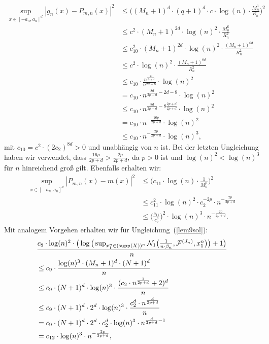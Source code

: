 \begin{equation}
\label{3rdsum}
\begin{split}
\sup_{x \in [-a_n, a_n]^d} |g_n(x) - P_{m,n}(x)|^2 & \leq \bigg((M_n + 1)^d \cdot (q + 1)^d \cdot c \cdot \log(n) \cdot \frac{M_n^3}{R_n}\bigg)^2 \\
& \leq c^2 \cdot (M_n + 1)^{2d} \cdot \log(n)^2 \cdot \frac{M_n^6}{R_n^2} \\
& \leq  c_{10}^2 \cdot (M_n + 1)^{2d} \cdot \log(n)^2 \cdot \frac{(M_n + 1)^{6d}}{R_n^2} \\
& \leq  c^2 \cdot \log(n)^2 \cdot \frac{(M_n + 1)^{8d}}{R_n^2} \\
& \leq c_{10} \cdot \frac{n^{\frac{8d}{2p + d}}}{n^{2d + 8}} \cdot \log(n)^2 \\
& = c_{10} \cdot n^{\frac{8d}{2p + d} - 2d -8} \cdot \log(n)^2 \\
& \leq c_{10} \cdot n^{\frac{8d}{2p + d}  -8\frac{2p + d}{2p + d}} \cdot \log(n)^2 \\
& = c_{10} \cdot n^{-\frac{16p}{2p + d}} \cdot \log(n)^2 \\
& \leq c_{10} \cdot n^{-\frac{2p}{2p + d}} \cdot \log(n)^3,
\end{split}
\end{equation}
mit $c_{10} = c^2 \cdot (2c_2)^{8d} > 0$ und unabhängig von $n$ ist. Bei der letzten Ungleichung haben wir verwendet, dass $\frac{16p}{2p + d} > \frac{2p}{2p + d}$, da $p > 0$ ist und $\log(n)^2 < \log(n)^3$ für $n$ hinreichend groß gilt. Ebenfalls erhalten wir:
\begin{equation}
\label{4thsum}
\begin{split}
\sup_{x \in [-a_n, a_n]^d} |P_{m,n}(x) - m(x)|^2 & \leq \bigg(c_{11} \cdot \log(n) \cdot \frac{1}{M_n^p}\bigg)^2 \\
& \leq c_{11}^2 \cdot \log(n)^2 \cdot c_{2}^{-2p} \cdot n^{-\frac{2p}{2p + d}} \\
& \leq \bigg(\frac{c_{11}}{c_2^p}\bigg)^2 \cdot \log(n)^3 \cdot n^{-\frac{2p}{2p + d}}.
\end{split}
\end{equation}
Mit analogem Vorgehen erhalten wir für Ungleichung~(\ref{lem9sol}):
\begin{equation}
\begin{split}
& \frac{c_8 \cdot \log(n)^2 \cdot \big(\log\big(\sup_{x_1^n \in (\operatorname{supp}(X))^n}\mathcal{N}_1\big(\frac{1}{n \cdot \beta_n},\mathcal{F}^{(J_n)},x_1^n\big)\big) + 1\big)}{n} \\
& \leq c_9 \cdot \frac{\log(n)^3 \cdot (M_n + 1)^d \cdot (N + 1)^d}{n} \\
& \leq c_9 \cdot (N+1)^d \cdot \log(n)^3 \cdot \frac{(c_2 \cdot n^{\frac{1}{2p + d}} + 2)^d}{n} \\
& \leq c_9 \cdot (N+1)^d \cdot 2^d \cdot \log(n)^3 \cdot \frac{c_2^d\cdot n^{\frac{d}{2p + d}}}{n} \\
& = c_9 \cdot (N+1)^d \cdot 2^d \cdot c_2^d \cdot \log(n)^3 \cdot n^{\frac{d}{2p + d} - 1} \\
& = c_{12} \cdot \log(n)^3 \cdot n^{-\frac{2p}{2p + d}},
\end{split}
\end{equation}
